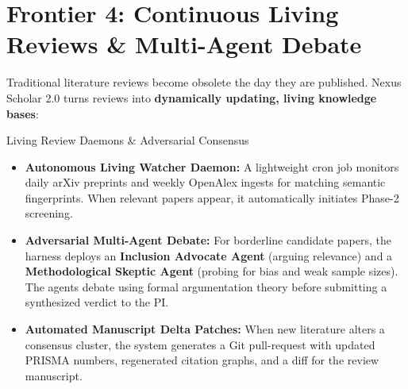 \documentclass[10pt,a4paper]{article}
\begin{document}
\begin{center}
\end{center}
\vspace{-4pt}

\section{Frontier 4: Continuous Living Reviews \& Multi-Agent Debate}

Traditional literature reviews become obsolete the day they are published. Nexus Scholar 2.0 turns reviews into \textbf{dynamically updating, living knowledge bases}:

\begin{featurebox}{Living Review Daemons \& Adversarial Consensus}
\begin{itemize}[leftmargin=1.2em, itemsep=2pt, topsep=1pt]
    \item \textbf{Autonomous Living Watcher Daemon:} A lightweight cron job monitors daily arXiv preprints and weekly OpenAlex ingests for matching semantic fingerprints. When relevant papers appear, it automatically initiates Phase-2 screening.
    \item \textbf{Adversarial Multi-Agent Debate:} For borderline candidate papers, the harness deploys an \textbf{Inclusion Advocate Agent} (arguing relevance) and a \textbf{Methodological Skeptic Agent} (probing for bias and weak sample sizes). The agents debate using formal argumentation theory before submitting a synthesized verdict to the PI.
    \item \textbf{Automated Manuscript Delta Patches:} When new literature alters a consensus cluster, the system generates a Git pull-request with updated PRISMA numbers, regenerated citation graphs, and a diff for the review manuscript.
\end{itemize}
\end{featurebox}
\end{document}
